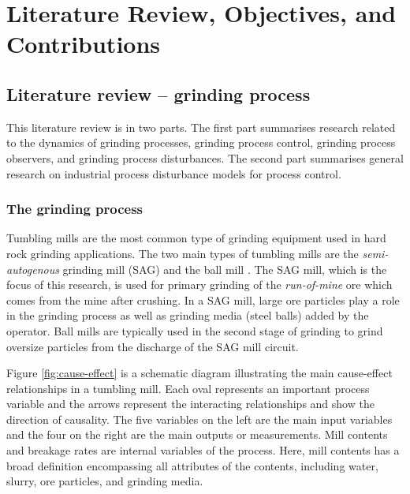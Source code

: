 \chapter{Literature Review, Objectives, and Contributions}
\label{chap-lit-review}

\section{Literature review – grinding process}

This literature review is in two parts. The first part summarises research related to the dynamics of grinding processes, grinding process control, grinding process observers, and grinding process disturbances. The second part summarises general research on industrial process disturbance models for process control.

\subsection{The grinding process}

Tumbling mills are the most common type of grinding equipment used in hard rock grinding applications. The two main types of tumbling mills are the \textit{semi-autogenous} grinding mill (\gls{SAG}) and the ball mill \citep{king_chapter_2012}. The \gls{SAG} mill, which is the focus of this research, is used for primary grinding of the \textit{run-of-mine} ore which comes from the mine after crushing. In a \gls{SAG} mill, large ore particles play a role in the grinding process as well as grinding media (steel balls) added by the operator. Ball mills are typically used in the second stage of grinding to grind oversize particles from the discharge of the \gls{SAG} mill circuit.

Figure \ref{fig:cause-effect} is a schematic diagram illustrating the main cause-effect relationships in a tumbling mill. Each oval represents an important process variable and the arrows represent the interacting relationships and show the direction of causality. The five variables on the left are the main input variables and the four on the right are the main outputs or measurements. Mill contents and breakage rates are internal variables of the process. Here, mill contents has a broad definition encompassing all attributes of the contents, including water, slurry, ore particles, and grinding media.

